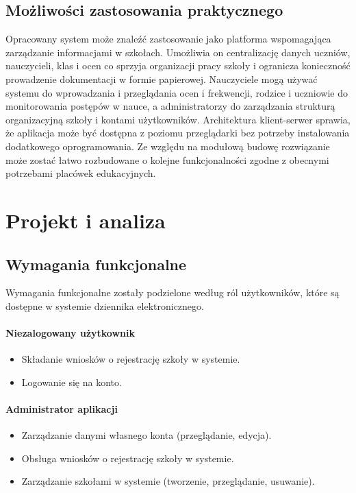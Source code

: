 \documentclass[12pt,a4paper]{article}
\begin{document}
\subsection{Możliwości zastosowania praktycznego}
Opracowany system może znaleźć zastosowanie jako platforma wspomagająca zarządzanie informacjami w szkołach. Umożliwia on centralizację danych uczniów, nauczycieli, klas i ocen co sprzyja organizacji pracy szkoły i ogranicza konieczność prowadzenie dokumentacji w formie papierowej. Nauczyciele mogą używać systemu do wprowadzania i przeglądania ocen i frekwencji, rodzice i uczniowie do monitorowania postępów w nauce, a administratorzy do zarządzania strukturą organizacyjną szkoły i kontami użytkowników. Architektura klient-serwer sprawia, że aplikacja może być dostępna z poziomu przeglądarki bez potrzeby instalowania dodatkowego oprogramowania. Ze względu na modułową budowę rozwiązanie może zostać łatwo rozbudowane o kolejne funkcjonalności zgodne z obecnymi potrzebami placówek edukacyjnych.

\section{Projekt i analiza}
\subsection{Wymagania funkcjonalne}
Wymagania funkcjonalne zostały podzielone według ról użytkowników, które są dostępne w systemie dziennika elektronicznego.

\paragraph{Niezalogowany użytkownik}
\begin{itemize}
    \item Składanie wniosków o rejestrację szkoły w systemie.
    \item Logowanie się na konto.
\end{itemize}

\paragraph{Administrator aplikacji}
\begin{itemize}
    \item Zarządzanie danymi własnego konta (przeglądanie, edycja).
    \item Obsługa wniosków o rejestrację szkoły w systemie.
    \item Zarządzanie szkołami w systemie (tworzenie, przeglądanie, usuwanie).
\end{itemize}
\end{document}
